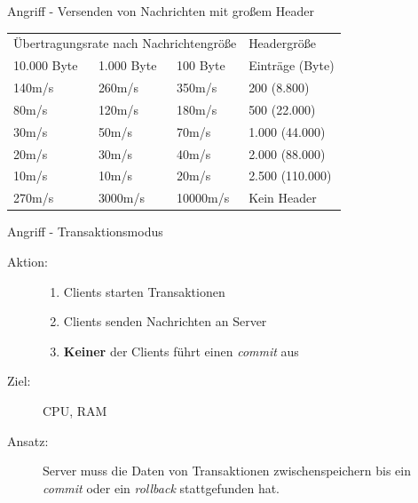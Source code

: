 \documentclass[10pt]{beamer}
\begin{document}
\begin{frame}{Angriff - Versenden von Nachrichten mit großem Header}
\begin{table}[h]
	\centering
	\begin{tabular}{p{3cm}ll|p{3cm}}
		\multicolumn{3}{l|}{Übertragungsrate nach Nachrichtengröße}  & Headergröße     \\
		10.000 Byte          & 1.000 Byte              & 100 Byte    & Einträge (Byte) \\ \hline
		140m/s               & 260m/s                  & 350m/s      & 200 (8.800)     \\
		80m/s                & 120m/s                  & 180m/s      & 500 (22.000)    \\
		30m/s                & 50m/s                   & 70m/s       & 1.000 (44.000)  \\
		20m/s                & 30m/s                   & 40m/s       & 2.000 (88.000)  \\
		10m/s                & 10m/s                   & 20m/s       & 2.500 (110.000) \\ \hline
		270m/s              & 3000m/s              & 10000m/s & Kein Header \\
	\end{tabular}
\end{table}
\end{frame}

\begin{frame}[t]{Angriff - Transaktionsmodus}
\begin{description}
	\item[Aktion:]
		\begin{enumerate}
			\item Clients starten Transaktionen
			\item Clients senden Nachrichten an Server
			\item \textbf{Keiner} der Clients führt einen \textsl{commit} aus
		\end{enumerate} \smallskip
	\item[Ziel:] CPU, RAM \smallskip
	\item[Ansatz:] Server muss die Daten von Transaktionen zwischenspeichern bis ein \textsl{commit} oder ein \textsl{rollback} stattgefunden hat.
\end{description}
\end{frame}
\end{document}
